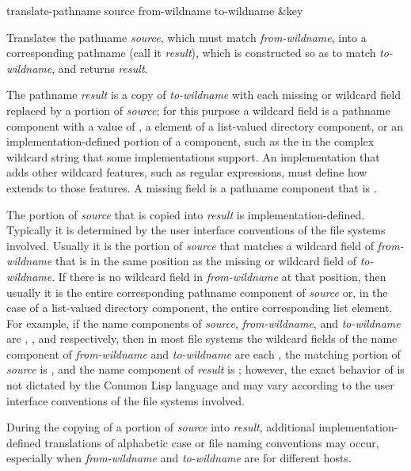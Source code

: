 \begin{defun}[Function]
translate-pathname source from-wildname to-wildname &key

Translates the pathname \emph{source}, which must match \emph{from-wildname},
into a corresponding pathname (call it \emph{result}), which is constructed so
as to match \emph{to-wildname}, and returns \emph{result}.

The pathname \emph{result} is a copy of \emph{to-wildname} with each missing or
wildcard field replaced by a portion of \emph{source}; for this purpose a
wildcard field is a pathname component with a value of , a 
element of a list-valued directory component, or an implementation-defined
portion of a component, such as the \cdf{*} in the complex wildcard string
 that some implementations support.  An implementation that adds
other wildcard features, such as regular expressions, must define how
 extends to those features.  A missing field is a
pathname component that is .

The portion of \emph{source} that is copied into \emph{result} is
implementation-defined.  Typically it is determined by the user interface
conventions of the file systems involved.  Usually it is the portion of
\emph{source} that matches a wildcard field of \emph{from-wildname} that is in
the same position as the missing or wildcard field of \emph{to-wildname}.  If
there is no wildcard field in \emph{from-wildname} at that position, then
usually it is the entire corresponding pathname component of \emph{source} or,
in the case of a list-valued directory component, the entire corresponding list
element.  For example, if the name components of \emph{source},
\emph{from-wildname}, and \emph{to-wildname} are , , and
 respectively, then in most file systems the wildcard fields of the
name component of \emph{from-wildname} and \emph{to-wildname} are each ,
the matching portion of \emph{source} is , and the name component of
\emph{result} is ; however, the exact behavior of
 is not dictated by the Common Lisp language and may
vary according to the user interface conventions of the file systems involved.

During the copying of a portion of \emph{source} into \emph{result}, additional
implementation-defined translations of alphabetic case or file naming
conventions may occur, especially when \emph{from-wildname} and
\emph{to-wildname} are for different hosts.


\end{defun}
